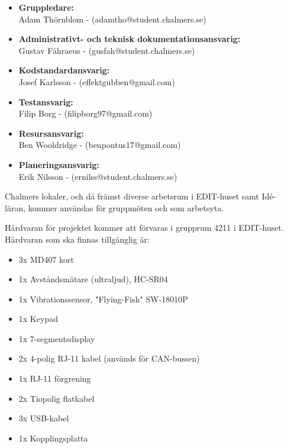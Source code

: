 \documentclass[a4paper]{article}
\begin{document}
\begin{itemize}
    \item \textbf{Gruppledare:}
    \\
    Adam Thörnblom - (adamtho@student.chalmers.se)
    
    \item \textbf{Administrativt- och teknisk dokumentationsansvarig:} 
    \\
    Gustav Fåhraeus - (gusfah@student.chalmers.se)

    \item \textbf{Kodstandardansvarig:}
    \\
    Josef Karlsson - (effektgubben@gmail.com)

    \item \textbf{Testansvarig:}
    \\
    Filip Borg - (filipborg97@gmail.com) 

    \item \textbf{Resursansvarig:} 
    \\
    Ben Wooldridge - (benpontus17@gmail.com)

    \item \textbf{Planeringsansvarig:}
    \\
    Erik Nilsson - (ernilss@student.chalmers.se) 
\end{itemize}

Chalmers lokaler, och då främst diverse arbetsrum i EDIT-huset samt Idé-\\läran, kommer användas för gruppmöten och som arbetsyta.

Hårdvaran för projektet kommer att förvaras i grupprum 4211 i EDIT-huset. Hårdvaran som ska finnas tillgänglig är:
\begin{itemize}
    \item 3x MD407 kort 
    \item 1x Avståndsmätare (ultraljud), HC-SR04 
    \item 1x Vibrationssensor, "Flying-Fish" SW-18010P 
    \item 1x Keypad 
    \item 1x 7-segmentsdisplay 
    \item 2x 4-polig RJ-11 kabel (används för CAN-bussen) 
    \item 1x RJ-11 förgrening
    \item 2x Tiopolig flatkabel 
    \item 3x USB-kabel 
    \item 1x Kopplingsplatta
\end{itemize}
\end{document}
